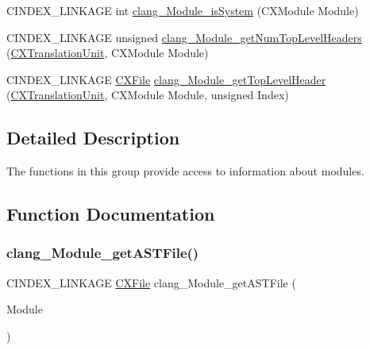 \begin{DoxyCompactItemize}
\item 
C\+I\+N\+D\+E\+X\+\_\+\+L\+I\+N\+K\+A\+GE int \mbox{\hyperlink{group__CINDEX__MODULE_ga1e4ad74c404b5f3bcd30cec4dc12fa34}{clang\+\_\+\+Module\+\_\+is\+System}} (C\+X\+Module Module)
\item 
C\+I\+N\+D\+E\+X\+\_\+\+L\+I\+N\+K\+A\+GE unsigned \mbox{\hyperlink{group__CINDEX__MODULE_gaee667293d56a18d3e8c17e37ce77cb0d}{clang\+\_\+\+Module\+\_\+get\+Num\+Top\+Level\+Headers}} (\mbox{\hyperlink{group__CINDEX_gacdb7815736ca709ce9a5e1ec2b7e16ac}{C\+X\+Translation\+Unit}}, C\+X\+Module Module)
\item 
C\+I\+N\+D\+E\+X\+\_\+\+L\+I\+N\+K\+A\+GE \mbox{\hyperlink{group__CINDEX__FILES_gacfcea9c1239c916597e2e5b3e109215a}{C\+X\+File}} \mbox{\hyperlink{group__CINDEX__MODULE_ga08aa0746251ca2e8eee69c8fe7c15e2b}{clang\+\_\+\+Module\+\_\+get\+Top\+Level\+Header}} (\mbox{\hyperlink{group__CINDEX_gacdb7815736ca709ce9a5e1ec2b7e16ac}{C\+X\+Translation\+Unit}}, C\+X\+Module Module, unsigned Index)
\end{DoxyCompactItemize}


\subsection{Detailed Description}
The functions in this group provide access to information about modules. 

\subsection{Function Documentation}
\mbox{\label{group__CINDEX__MODULE_gaa5095dd877556655d096d3165e86b0e1}} 
\subsubsection{\texorpdfstring{clang\+\_\+\+Module\+\_\+get\+A\+S\+T\+File()}{clang\_Module\_getASTFile()}}
{\footnotesize\ttfamily C\+I\+N\+D\+E\+X\+\_\+\+L\+I\+N\+K\+A\+GE \mbox{\hyperlink{group__CINDEX__FILES_gacfcea9c1239c916597e2e5b3e109215a}{C\+X\+File}} clang\+\_\+\+Module\+\_\+get\+A\+S\+T\+File (\begin{DoxyParamCaption}\item[{C\+X\+Module}]{Module }\end{DoxyParamCaption})}


